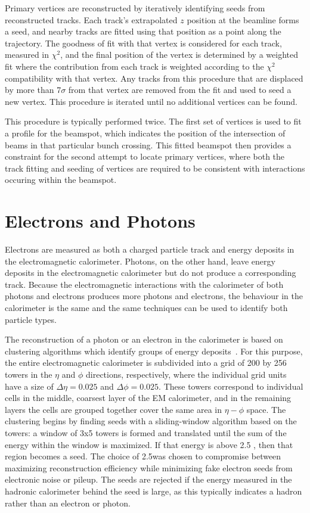 Primary vertices are reconstructed by iteratively identifying seeds from reconstructed tracks.
Each track's extrapolated $z$ position at the beamline forms a seed, and nearby tracks are fitted using that position as a point along the trajectory.
The goodness of fit with that vertex is considered for each track, measured in $\chi^2$, and the final position of the vertex is determined by a weighted fit where the contribution from each track is weighted according to the $\chi^2$ compatibility with that vertex.
Any tracks from this procedure that are displaced by more than 7$\sigma$ from that vertex are removed from the fit and used to seed a new vertex.
This procedure is iterated until no additional vertices can be found.

This procedure is typically performed twice.
The first set of vertices is used to fit a profile for the beamspot, which indicates the position of the intersection of beams in that particular bunch crossing.
This fitted beamspot then provides a constraint for the second attempt to locate primary vertices, where both the track fitting and seeding of vertices are required to be consistent with interactions occuring within the beamspot.


\section{Electrons and Photons}
\label{sec:egamma}

Electrons are measured as both a charged particle track and energy deposits in the electromagnetic calorimeter.
Photons, on the other hand, leave energy deposits in the electromagnetic calorimeter but do not produce a corresponding track.
Because the electromagnetic interactions with the calorimeter of both photons and electrons produces more photons and electrons, the behaviour in the calorimeter is the same and the same techniques can be used to identify both particle types.

The reconstruction of a photon or an electron in the calorimeter is based on clustering algorithms which identify groups of energy deposits~\cite{PERF-2013-03}.
For this purpose, the entire electromagnetic calorimeter is subdivided into a grid of 200 by 256 towers in the $\eta$ and $\phi$ directions, respectively, where the individual grid units have a size of $\Delta\eta = 0.025$ and $\Delta\phi = 0.025$.
These towers correspond to individual cells in the middle, coarsest layer of the \ac{EM} calorimeter, and in the remaining layers the cells are grouped together cover the same area in $\eta-\phi$ space.
The clustering begins by finding seeds with a sliding-window algorithm based on the towers: a window of 3x5 towers is formed and translated until the sum of the energy within the window is maximized.
If that energy is above 2.5 \GeV, then that region becomes a seed.
The choice of 2.5\GeV was chosen to compromise between maximizing reconstruction efficiency while minimizing fake electron seeds from electronic noise or pileup.
The seeds are rejected if the energy measured in the hadronic calorimeter behind the seed is large, as this typically indicates a hadron rather than an electron or photon.

